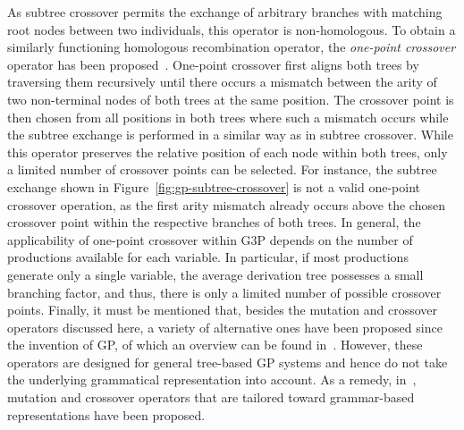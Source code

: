As subtree crossover permits the exchange of arbitrary branches with matching root nodes between two individuals, this operator is non-homologous.
To obtain a similarly functioning homologous recombination operator, the \emph{one-point crossover} operator has been proposed~\cite{poli1998schema}.
One-point crossover first aligns both trees by traversing them recursively until there occurs a mismatch between the arity of two non-terminal nodes of both trees at the same position.
The crossover point is then chosen from all positions in both trees where such a mismatch occurs while the subtree exchange is performed in a similar way as in subtree crossover.
While this operator preserves the relative position of each node within both trees, only a limited number of crossover points can be selected.
For instance, the subtree exchange shown in Figure~\ref{fig:gp-subtree-crossover} is not a valid one-point crossover operation, as the first arity mismatch already occurs above the chosen crossover point within the respective branches of both trees.
In general, the applicability of one-point crossover within G3P depends on the number of productions available for each variable.
In particular, if most productions generate only a single variable, the average derivation tree possesses a small branching factor, and thus, there is only a limited number of possible crossover points.
Finally, it must be mentioned that, besides the mutation and crossover operators discussed here, a variety of alternative ones have been proposed since the invention of GP, of which an overview can be found in~\cite{poli2008field}.
However, these operators are designed for general tree-based GP systems and hence do not take the underlying grammatical representation into account. 
As a remedy, in~\cite{couchet2007crossover}, mutation and crossover operators that are tailored toward grammar-based representations have been proposed.

